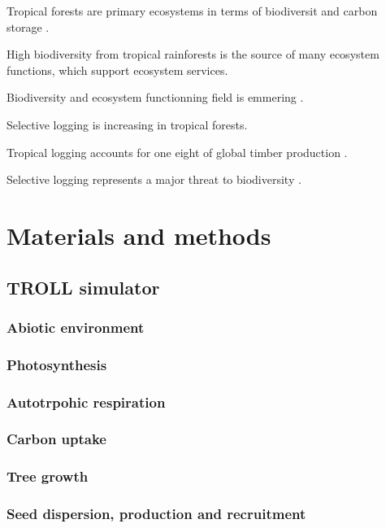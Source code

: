 \documentclass[]{article}
\begin{document}
Tropical forests are primary ecosystems in terms of biodiversit and
carbon storage \citep{Lewis2004}.

High biodiversity from tropical rainforests is the source of many
ecosystem functions, which support ecosystem services.

Biodiversity and ecosystem functionning field is emmering
\citep{Loreau2000}.

Selective logging is increasing in tropical forests.

Tropical logging accounts for one eight of global timber production
\citep{Blaser2011}.

Selective logging represents a major threat to biodiversity
\citep{Gibson2013}.

\section{Materials and methods}\label{materials-and-methods}

\subsection{TROLL simulator}\label{troll-simulator}

\subsubsection{Abiotic environment}\label{abiotic-environment}

\subsubsection{Photosynthesis}\label{photosynthesis}

\subsubsection{Autotrpohic respiration}\label{autotrpohic-respiration}

\subsubsection{Carbon uptake}\label{carbon-uptake}

\subsubsection{Tree growth}\label{tree-growth}

\subsubsection{Seed dispersion, production and
recruitment}\label{seed-dispersion-production-and-recruitment}
\end{document}
